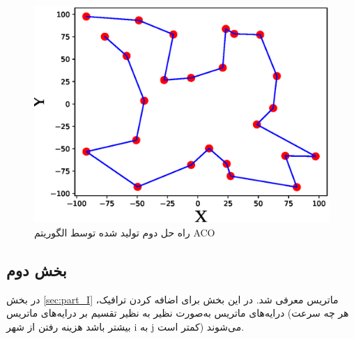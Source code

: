 \begin{figure}[H]\label{fig:part_I_ACO_sol_2}
	\caption{راه حل دوم تولید شده توسط الگوریتم ACO} 
	\centering 
	\includegraphics[width=16cm]{../Figure/Q2/ACO_solution_1} 
\end{figure}


\subsection{بخش دوم}\label{sec:part_II}

در بخش
\ref{sec:part_I}
ماتریس
معرفی شد. در این بخش برای اضافه کردن ترافیک، درایه‌های ماتریس
به‌صورت نظیر به نظیر تقسیم بر درایه‌های ماتریس
(هر چه سرعت بیشتر باشد هزینه رفتن از شهر i به j کمتر است) می‌شوند.

